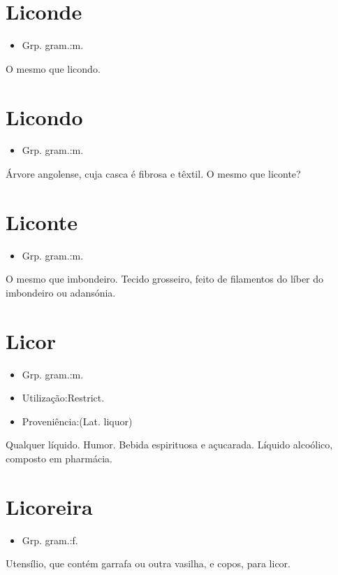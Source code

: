 \section{Liconde}
\begin{itemize}
\item {Grp. gram.:m.}
\end{itemize}
O mesmo que \textunderscore licondo\textunderscore .
\section{Licondo}
\begin{itemize}
\item {Grp. gram.:m.}
\end{itemize}
Árvore angolense, cuja casca é fibrosa e têxtil.
O mesmo que \textunderscore liconte\textunderscore ?
\section{Liconte}
\begin{itemize}
\item {Grp. gram.:m.}
\end{itemize}
O mesmo que \textunderscore imbondeiro\textunderscore .
Tecido grosseiro, feito de filamentos do líber do imbondeiro ou adansónia.
\section{Licor}
\begin{itemize}
\item {Grp. gram.:m.}
\end{itemize}
\begin{itemize}
\item {Utilização:Restrict.}
\end{itemize}
\begin{itemize}
\item {Proveniência:(Lat. \textunderscore liquor\textunderscore )}
\end{itemize}
Qualquer líquido.
Humor.
Bebida espirituosa e açucarada.
Líquido alcoólico, composto em pharmácia.
\section{Licoreira}
\begin{itemize}
\item {Grp. gram.:f.}
\end{itemize}
Utensílio, que contém garrafa ou outra vasilha, e copos, para licor.
